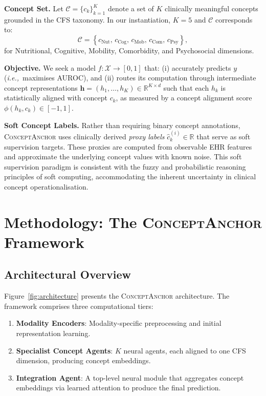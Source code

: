 \documentclass[review,12pt,authoryear]{elsarticle}
\newcommand{\modelname}{\textsc{ConceptAnchor}}
\newcommand{\ie}{\textit{i.e.,}\ }
\begin{document}
\textbf{Concept Set.}
Let $\mathcal{C} = \{c_k\}_{k=1}^{K}$ denote a set of $K$ clinically meaningful concepts grounded in the CFS taxonomy.
In our instantiation, $K = 5$ and $\mathcal{C}$ corresponds to:
\begin{equation}
  \mathcal{C} = \left\{c_{\text{Nut}},\, c_{\text{Cog}},\, c_{\text{Mob}},\, c_{\text{Com}},\, c_{\text{Psy}}\right\},
\end{equation}
for Nutritional, Cognitive, Mobility, Comorbidity, and Psychosocial dimensions.

\textbf{Objective.}
We seek a model $f: \mathcal{X} \to [0,1]$ that: (i) accurately predicts $y$ (\ie maximises AUROC), and (ii) routes its computation through intermediate concept representations $\mathbf{h} = (h_1, \ldots, h_K) \in \mathbb{R}^{K \times d}$ such that each $h_k$ is statistically aligned with concept $c_k$, as measured by a concept alignment score $\phi(h_k, c_k) \in [-1, 1]$.

\textbf{Soft Concept Labels.}
Rather than requiring binary concept annotations, \modelname{} uses clinically derived \emph{proxy labels} $\hat{c}_k^{(i)} \in \mathbb{R}$ that serve as soft supervision targets.
These proxies are computed from observable EHR features and approximate the underlying concept values with known noise.
This soft supervision paradigm is consistent with the fuzzy and probabilistic reasoning principles of soft computing, accommodating the inherent uncertainty in clinical concept operationalisation.

\section{Methodology: The \modelname{} Framework}
\label{sec:method}

\subsection{Architectural Overview}

Figure~\ref{fig:architecture} presents the \modelname{} architecture.
The framework comprises three computational tiers:

\begin{enumerate}[leftmargin=*, label=\arabic*., noitemsep]
  \item \textbf{Modality Encoders}: Modality-specific preprocessing and initial representation learning.
  \item \textbf{Specialist Concept Agents}: $K$ neural agents, each aligned to one CFS dimension, producing concept embeddings.
  \item \textbf{Integration Agent}: A top-level neural module that aggregates concept embeddings via learned attention to produce the final prediction.
\end{enumerate}
\end{document}
